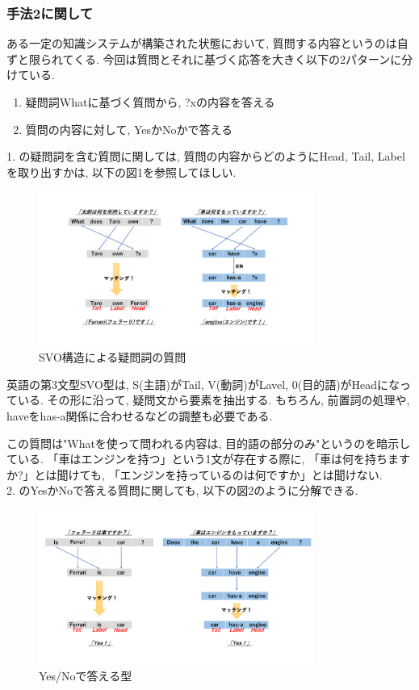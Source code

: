 \documentclass[uplatex,12pt]{jsarticle}
\begin{document}
\subsubsection{手法2に関して}
ある一定の知識システムが構築された状態において, 質問する内容というのは自ずと限られてくる. 今回は質問とそれに基づく応答を大きく以下の2パターンに分けている. 

\begin{enumerate}
\item 疑問詞Whatに基づく質問から,  ?xの内容を答える
\item 質問の内容に対して, YesかNoかで答える
\end{enumerate}

1. の疑問詞を含む質問に関しては, 質問の内容からどのようにHead, Tail, Labelを取り出すかは, 以下の図1を参照してほしい.
\begin{figure}[htbp]
 \begin{center}
  \includegraphics[width = 9cm, pagebox = cropbox, clip]{英文構造_疑問詞SVO.pdf}
 \end{center}
 \caption[]{SVO構造による疑問詞の質問}\label{fig:fig1.1}
\end{figure}

英語の第3文型SVO型は, S(主語)がTail, V(動詞)がLavel, 0(目的語)がHeadになっている. その形に沿って, 疑問文から要素を抽出する. もちろん, 前置詞の処理や, haveをhas-a関係に合わせるなどの調整も必要である.

この質問は"Whatを使って問われる内容は, 目的語の部分のみ"というのを暗示している. 「車はエンジンを持つ」という1文が存在する際に, 「車は何を持ちますか?」とは聞けても, 「エンジンを持っているのは何ですか」とは聞けない. \\

2. のYesかNoで答える質問に関しても, 以下の図2のように分解できる.
\begin{figure}[htbp]
 \begin{center}
  \includegraphics[width = 9cm, pagebox = cropbox, clip]{英文構造_YesNo型.pdf}
 \end{center}
 \caption[]{Yes/Noで答える型}\label{fig:fig1.1}
\end{figure}
\end{document}

